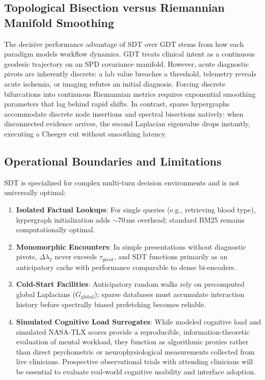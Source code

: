 \documentclass[ijds,dblanonrev]{informs4}
\begin{document}
\subsection{Topological Bisection versus Riemannian Manifold Smoothing}
The decisive performance advantage of SDT over GDT stems from how each paradigm models workflow dynamics. GDT treats clinical intent as a continuous geodesic trajectory on an SPD covariance manifold. However, acute diagnostic pivots are inherently discrete: a lab value breaches a threshold, telemetry reveals acute ischemia, or imaging refutes an initial diagnosis. Forcing discrete bifurcations into continuous Riemannian metrics requires exponential smoothing parameters that lag behind rapid shifts. In contrast, sparse hypergraphs accommodate discrete node insertions and spectral bisections natively: when disconnected evidence arrives, the second Laplacian eigenvalue drops instantly, executing a Cheeger cut without smoothing latency.

\subsection{Operational Boundaries and Limitations}
SDT is specialized for complex multi-turn decision environments and is not universally optimal:
\begin{enumerate}[(1)]
  \item \textbf{Isolated Factual Lookups}: For single queries (e.g., retrieving blood type), hypergraph initialization adds $\sim$70\,ms overhead; standard BM25 remains computationally optimal.
  \item \textbf{Monomorphic Encounters}: In simple presentations without diagnostic pivots, $\Delta \lambda_2$ never exceeds $\tau_{\text{pivot}}$, and SDT functions primarily as an anticipatory cache with performance comparable to dense bi-encoders.
  \item \textbf{Cold-Start Facilities}: Anticipatory random walks rely on precomputed global Laplacians ($G_{\text{global}}$); sparse databases must accumulate interaction history before spectrally biased prefetching becomes reliable.
  \item \textbf{Simulated Cognitive Load Surrogates}: While modeled cognitive load and simulated NASA-TLX scores provide a reproducible, information-theoretic evaluation of mental workload, they function as algorithmic proxies rather than direct psychometric or neurophysiological measurements collected from live clinicians. Prospective observational trials with attending clinicians will be essential to evaluate real-world cognitive usability and interface adoption.
\end{enumerate}
\end{document}
